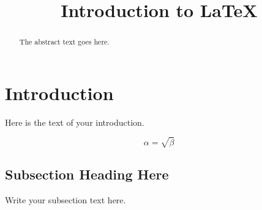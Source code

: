 \documentclass{article}
\begin{document}
\title{Introduction to \LaTeX{}}

\maketitle
\begin{abstract}
The abstract text goes here.
\end{abstract}

\section{Introduction}
Here is the text of your introduction.

\begin{equation}
    \alpha = \sqrt{ \beta }
\end{equation}

\subsection{Subsection Heading Here}
Write your subsection text here.
\end{document}

